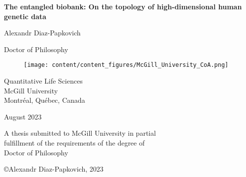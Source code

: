 \begin{titlepage}
\begin{center}







{\sf\bfseries\LARGE  The entangled biobank: On the topology of high-dimensional human genetic data }






{\large Alexandr Diaz-Papkovich}


Doctor of Philosophy


\begin{figure}[H]
\centering
\texttt{[image: content/content\_figures/McGill\_University\_CoA.png]}
\end{figure}

Quantitative Life Sciences\\
McGill University\\
Montr\'{e}al, Qu\'{e}bec, Canada\\

\vspace{1.5cm}


August 2023




\noindent
A thesis submitted to McGill University in partial\\
fulfillment of the requirements of the degree of\\
Doctor of Philosophy


\vspace{1.4cm}

{\small \copyright Alexandr Diaz-Papkovich, 2023}


\end{center}
\end{titlepage}





